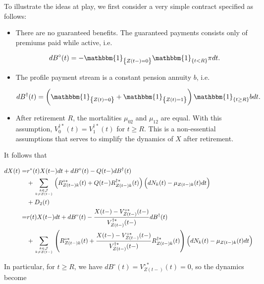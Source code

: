 \documentclass{book}
\newcommand{\1}[1]{\mathbbm{1}_{\left\lbrace #1 \right\rbrace}}
\theoremstyle{break}
\theoremstyle{remark}
\numberwithin{equation}{section}
\begin{document}
\begin{example}

To illustrate the ideas at play, we first consider a very simple contract specified as follows:

\begin{itemize}
	\item There are no guaranteed benefits. The guaranteed payments consists only of premiums paid while active, i.e.
	
	\begin{align*}
		dB^\circ(t) = - \1{Z(t-)=0} \1{t < R} \pi dt.
	\end{align*}
	
	\item The profile payment stream is a constant pension annuity $b$, i.e.
	
	\begin{align*}
		dB^\dagger(t) = \left( \1{Z(t)=0} + \1{Z(t)=1} \right) \1{t \geq R} b dt.
	\end{align*}

	\item After retirement $R$, the mortalities $\mu_{02}$ and $\mu_{12}$ are equal. With this assumption, $V_{0}^{\dagger*}(t)=V_{1}^{\dagger*}(t)$ for $t \geq R$. This is a non-essential assumptions that serves to simplify the dynamics of $X$ after retirement.
\end{itemize}

It follows that
	
\begin{align*}
	dX(t) =& r^*(t) X(t-) dt + dB^\circ(t) - Q(t-) dB^\dagger(t) \\
	&+ \sum_{k \in \mathcal{J} \atop k \neq Z(t-)} \left( R_{Z(t-)k}^{\circ*}(t) + Q(t-) R_{Z(t-)k}^{\dagger*}(t) \right) \left( dN_k(t) - \mu_{Z(t-)k}(t) dt \right) \\
	&+ D_2(t) \\
	=& r(t) X(t-) dt + dB^\circ(t) - \frac{X(t-) - V_{Z(t-)}^{\circ*}(t-)}{V_{Z(t-)}^{\dagger*}(t-)} dB^\dagger(t) \\
	&+ \sum_{k \in \mathcal{J} \atop k \neq Z(t-)} \left( R_{Z(t-)k}^{\circ*}(t) + \frac{X(t-) - V_{Z(t-)}^{\circ*}(t-)}{V_{Z(t-)}^{\dagger*}(t-)} R_{Z(t-)k}^{\dagger*}(t) \right) \left( dN_k(t) - \mu_{Z(t-)k}(t) dt \right) \\
\end{align*}

In particular, for $t \geq R$, we have $dB^\circ(t) =  V_{Z(t-)}^{\circ*}(t)= 0$, so the dynamics become


\end{example}
\end{document}
